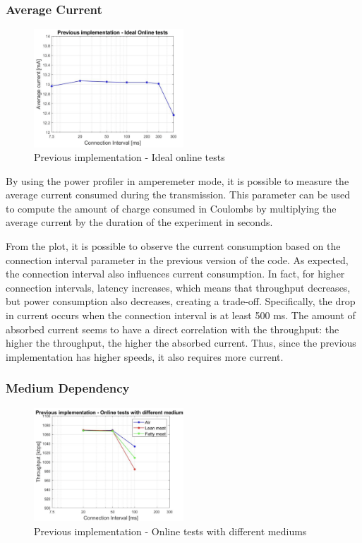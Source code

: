 \documentclass{Configuration_Files/PoliMi3i_thesis}
\begin{document}
\subsubsection*{Average Current}

\begin{figure}[H]
    \centering
    \includegraphics[width=0.5\textwidth]{Results Manuel/figure6}
    \caption{Previous implementation - Ideal online tests}
    \label{manuel_results_6}
\end{figure}

By using the power profiler in amperemeter mode, it is possible to measure the average current consumed during the transmission. This parameter can be used to compute the amount of charge consumed in Coulombs by multiplying the average current by the duration of the experiment in seconds.

From the plot, it is possible to observe the current consumption based on the connection interval parameter in the previous version of the code. As expected, the connection interval also influences current consumption. In fact, for higher connection intervals, latency increases, which means that throughput decreases, but power consumption also decreases, creating a trade-off. Specifically, the drop in current occurs when the connection interval is at least 500 ms. The amount of absorbed current seems to have a direct correlation with the throughput: the higher the throughput, the higher the absorbed current. Thus, since the previous implementation has higher speeds, it also requires more current.

\subsubsection*{Medium Dependency}

\begin{figure}[H]
    \centering
    \includegraphics[width=0.5\textwidth]{Results Manuel/figure7}
    \caption{Previous implementation - Online tests with different mediums}
    \label{manuel_results_7}
\end{figure}
\end{document}
